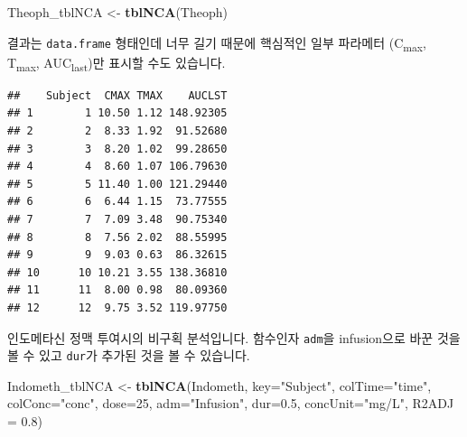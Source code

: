 \documentclass[9pt,]{krantz}
\newenvironment{Shaded}{\begin{snugshade}}{\end{snugshade}}
\newcommand{\DataTypeTok}[1]{\textcolor[rgb]{0.13,0.29,0.53}{#1}}
\newcommand{\DecValTok}[1]{\textcolor[rgb]{0.00,0.00,0.81}{#1}}
\newcommand{\FloatTok}[1]{\textcolor[rgb]{0.00,0.00,0.81}{#1}}
\newcommand{\KeywordTok}[1]{\textcolor[rgb]{0.13,0.29,0.53}{\textbf{#1}}}
\newcommand{\NormalTok}[1]{#1}
\newcommand{\OperatorTok}[1]{\textcolor[rgb]{0.81,0.36,0.00}{\textbf{#1}}}
\newcommand{\StringTok}[1]{\textcolor[rgb]{0.31,0.60,0.02}{#1}}
\begin{document}
\begin{Shaded}
\begin{Highlighting}[]
\NormalTok{Theoph_tblNCA <-}\StringTok{ }\KeywordTok{tblNCA}\NormalTok{(Theoph)}
\end{Highlighting}
\end{Shaded}

결과는 \texttt{data.frame} 형태인데 너무 길기 때문에 핵심적인 일부 파라메터 (C\textsubscript{max}, T\textsubscript{max}, AUC\textsubscript{last})만 표시할 수도 있습니다.

\begin{Shaded}
\end{Shaded}

\begin{verbatim}
##    Subject  CMAX TMAX    AUCLST
## 1        1 10.50 1.12 148.92305
## 2        2  8.33 1.92  91.52680
## 3        3  8.20 1.02  99.28650
## 4        4  8.60 1.07 106.79630
## 5        5 11.40 1.00 121.29440
## 6        6  6.44 1.15  73.77555
## 7        7  7.09 3.48  90.75340
## 8        8  7.56 2.02  88.55995
## 9        9  9.03 0.63  86.32615
## 10      10 10.21 3.55 138.36810
## 11      11  8.00 0.98  80.09360
## 12      12  9.75 3.52 119.97750
\end{verbatim}

인도메타신 정맥 투여시의 비구획 분석입니다.
함수인자 \texttt{adm}을 infusion으로 바꾼 것을 볼 수 있고 \texttt{dur}가 추가된 것을 볼 수 있습니다.

\begin{Shaded}
\begin{Highlighting}[]
\NormalTok{Indometh_tblNCA <-}\StringTok{ }\KeywordTok{tblNCA}\NormalTok{(Indometh, }\DataTypeTok{key=}\StringTok{"Subject"}\NormalTok{, }
                          \DataTypeTok{colTime=}\StringTok{"time"}\NormalTok{, }\DataTypeTok{colConc=}\StringTok{"conc"}\NormalTok{, }\DataTypeTok{dose=}\DecValTok{25}\NormalTok{, }
                          \DataTypeTok{adm=}\StringTok{"Infusion"}\NormalTok{, }\DataTypeTok{dur=}\FloatTok{0.5}\NormalTok{, }
                          \DataTypeTok{concUnit=}\StringTok{"mg/L"}\NormalTok{, }\DataTypeTok{R2ADJ =} \FloatTok{0.8}\NormalTok{)}
\end{Highlighting}
\end{Shaded}
\end{document}
